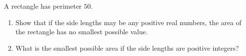A rectangle has perimeter $50$.
\begin{enumerate}
\item[(a)] Show that if the side lengths may be any positive real numbers, the area of the rectangle has no smallest possible value.
\item[(b)] What is the smallest possible area if the side lengths are positive integers?
\end{enumerate}
